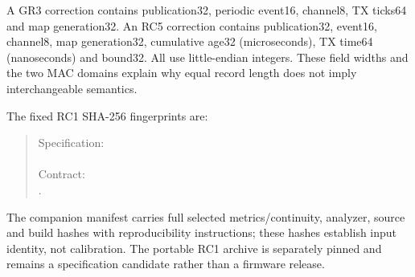 \documentclass[11pt,letterpaper]{article}
\begin{document}
A GR3 correction contains publication32, periodic event16, channel8, TX ticks64 and map generation32. An RC5 correction contains publication32, event16, channel8, map generation32, cumulative age32 (microseconds), TX time64 (nanoseconds) and bound32. All use little-endian integers. These field widths and the two MAC domains explain why equal record length does not imply interchangeable semantics.

\begin{samepage}
The fixed RC1 SHA-256 fingerprints are:
\begin{quote}\small
Specification: \\ \\
Contract: \\ .
\end{quote}
\end{samepage}
The companion manifest carries full selected metrics/continuity, analyzer, source and build hashes with reproducibility instructions; these hashes establish input identity, not calibration. The portable RC1 archive is separately pinned and remains a specification candidate rather than a firmware release.
\end{document}
